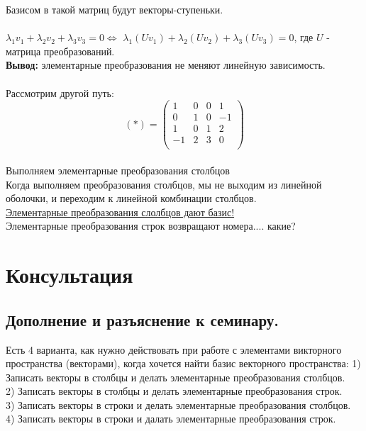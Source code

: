 \documentclass[a4paper,11pt]{report}
\begin{document}
Базисом в такой матриц будут векторы-ступеньки.\\
\\
$\lambda_1v_1 + \lambda_2v_2 + \lambda_3v_3 = 0 \Leftrightarrow$
$ \lambda_1(Uv_1) + \lambda_2(Uv_2) + \lambda_3(Uv_3) = 0$, где $U$ - матрица преобразований.\\
\textbf{Вывод:} элементарные преобразования не меняют линейную зависимость.\\
\\
Рассмотрим другой путь:\\
\[
(*) =
\begin{pmatrix}
1 & 0 & 0 & 1\\
0 & 1 & 0 & -1\\
1 & 0 & 1 & 2\\
-1 & 2 & 3 & 0\\
\end{pmatrix}
\]\\
Выполняем элементарные преобразования столбцов\\
Когда выполняем преобразования столбцов, мы не выходим из линейной оболочки, и переходим 
к линейной комбинации столбцов.\\
\underline{Элементарные преобразования слолбцов дают базис!}\\
Элементарные преобразования строк возвращают номера.... какие?
\section{Консультация}
\subsection{Дополнение и разъяснение к семинару.}
Есть 4 варианта, как нужно действовать при работе с элементами викторного пространства (векторами), когда хочется найти базис векторного пространства:
1) Записать векторы в столбцы и делать элементарные преобразования столбцов.\\
2) Записать векторы в столбцы и делать элементарные преобразования строк.\\
3) Записать векторы в строки и делать элементарные преобразования столбцов.\\
4) Записать векторы в строки и далать элементарные преобразования строк.\\
\end{document}
